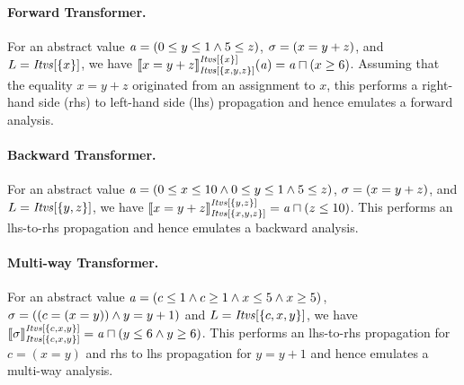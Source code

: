 \paragraph{Forward Transformer.} 
%
For an abstract value
$\absval=(0\leq y \leq 1 \wedge 5\leq z)$, $\constraint=(x=y+z)$, 
and $L={\intervals[\{x\}]}$,  we have
$\abstrans{\intervals[\{x,y,z\}]}{x=y+z}^{\intervals[\{x\}]}(\absval)=\absval\meet(x\geq
6)$.
Assuming that the equality $x=y+z$ originated from an assignment to $x$,
this performs a right-hand side (rhs) to left-hand side (lhs) propagation and
hence emulates a forward analysis. 

\paragraph{Backward Transformer.} 
For an abstract value $\absval=(0\leq x \leq 10 \wedge\allowbreak
0\leq y \leq 1 \wedge\allowbreak 5\leq z)$, 
$\constraint=(x=y+z)$, and $L={\intervals[\{y,z\}]}$, we have
$\abstrans{\intervals[\{x,y,z\}]}{x=y+z}^{\intervals[\{y,z\}]}=\absval\meet (z\leq 10)$. 
This performs an lhs-to-rhs propagation and hence emulates a backward analysis.  

\paragraph{Multi-way Transformer.} 
%
For an abstract value $\absval=(c\leq1 \wedge c\geq1 \wedge x\leq5 \wedge x\geq5)$, 
$\constraint=((c = (x=y)) \wedge y=y+1)$ and $L={\intervals[\{c,x,y\}]}$, we have 
$\abstrans{\intervals[\{c,x,y\}]}{\constraint}^{\intervals[\{c,x,y\}]}=\absval\meet(y\leq6
\wedge y\geq6)$.  This performs an lhs-to-rhs propagation for $c=(x=y)$ and rhs to lhs propagation
for $y=y+1$ and hence emulates a multi-way analysis.  
%

%

